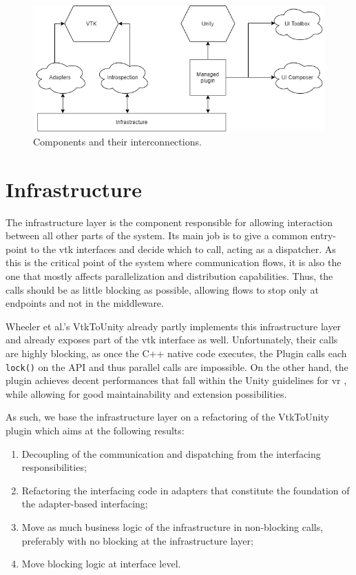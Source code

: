 \begin{figure}
    \centering
    \includegraphics[width=\textwidth]{pictures/Architecture-high-level-transparent.png}
    \caption{Components and their interconnections.}
    \label{fig:high-level-architecture}
\end{figure}

\section{Infrastructure}
\label{sec:design-infrastructure}

The infrastructure layer is the component responsible for allowing interaction between all other parts of the system. Its main job is to give a common entry-point to the \acrshort{vtk} interfaces and decide which to call, acting as a dispatcher. As this is the critical point of the system where communication flows, it is also the one that mostly affects parallelization and distribution capabilities. Thus, the calls should be as little blocking as possible, allowing flows to stop only at endpoints and not in the middleware.

Wheeler et al.'s VtkToUnity \cite{wheeler_virtual_2018} already partly implements this infrastructure layer and already exposes part of the \acrshort{vtk} interface as well. Unfortunately, their calls are highly blocking, as once the C++ native code executes, the Plugin calls each \verb|lock()| on the API and thus parallel calls are impossible. On the other hand, the plugin achieves decent performances that fall within the Unity guidelines for \acrshort{vr} \cite{unity_vr_2020}, while allowing for good maintainability and extension possibilities.

As such, we base the infrastructure layer on a refactoring of the VtkToUnity plugin which aims at the following results:

\begin{enumerate}
    \item Decoupling of the communication and dispatching from the interfacing responsibilities;
    \item Refactoring the interfacing code in adapters that constitute the foundation of the adapter-based interfacing;
    \item Move as much business logic of the infrastructure in non-blocking calls, preferably with no blocking at the infrastructure layer;
    \item Move blocking logic at interface level.
\end{enumerate}

